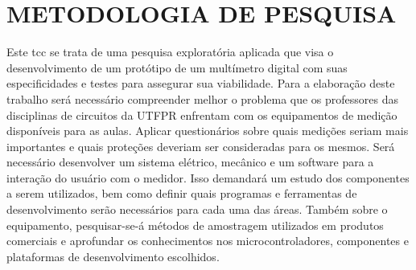 \section{METODOLOGIA DE PESQUISA}\label{sec:metodologiapesq}
Este tcc se trata de uma pesquisa exploratória aplicada que visa o desenvolvimento de um protótipo de um multímetro digital com suas especificidades e testes para assegurar sua viabilidade. 
Para a elaboração deste trabalho será necessário compreender melhor o problema que os professores das disciplinas de circuitos da UTFPR enfrentam com os equipamentos de medição disponíveis para as aulas. Aplicar questionários sobre quais medições seriam mais importantes e quais proteções deveriam ser consideradas para os mesmos.
Será necessário desenvolver um sistema elétrico, mecânico e um software para a interação do usuário com o medidor. Isso demandará um estudo dos componentes a serem utilizados, bem como definir quais programas e ferramentas de desenvolvimento serão necessários para cada uma das áreas.
Também sobre o equipamento, pesquisar-se-á métodos de amostragem utilizados em produtos comerciais e aprofundar os conhecimentos nos microcontroladores, componentes e plataformas de desenvolvimento escolhidos.